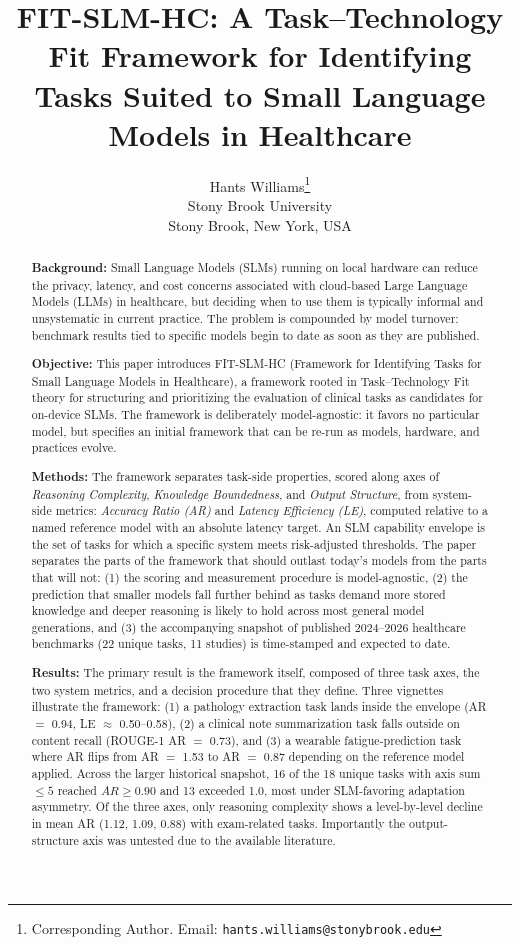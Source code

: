 \documentclass[11pt]{article}
\title{FIT-SLM-HC: A Task--Technology Fit Framework for Identifying Tasks Suited to Small Language Models in Healthcare}
\author{
  Hants Williams\thanks{Corresponding Author. Email: \texttt{hants.williams@stonybrook.edu}} \\
  Stony Brook University \\
  Stony Brook, New York, USA
}
\date{}
\begin{document}
\maketitle

\begin{abstract}
\textbf{Background:}
Small Language Models (SLMs) running on local hardware can reduce the privacy, latency, and cost concerns associated with cloud-based Large Language Models (LLMs) in healthcare, but deciding when to use them is typically informal and unsystematic in current practice. The problem is compounded by model turnover: benchmark results tied to specific models begin to date as soon as they are published.

\textbf{Objective:}
This paper introduces FIT-SLM-HC (Framework for Identifying Tasks for Small Language Models in Healthcare), a framework rooted in Task--Technology Fit theory for structuring and prioritizing the evaluation of clinical tasks as candidates for on-device SLMs. The framework is deliberately model-agnostic: it favors no particular model, but specifies an initial framework that can be re-run as models, hardware, and practices evolve.

\textbf{Methods:}
The framework separates task-side properties, scored along axes of \emph{Reasoning Complexity}, \emph{Knowledge Boundedness}, and \emph{Output Structure}, from system-side metrics: \emph{Accuracy Ratio (AR)} and \emph{Latency Efficiency (LE)}, computed relative to a named reference model with an absolute latency target. An SLM capability envelope is the set of tasks for which a specific system meets risk-adjusted thresholds. The paper separates the parts of the framework that should outlast today's models from the parts that will not: (1) the scoring and measurement procedure is model-agnostic, (2) the prediction that smaller models fall further behind as tasks demand more stored knowledge and deeper reasoning is likely to hold across most general model generations, and (3) the accompanying snapshot of published 2024--2026 healthcare benchmarks (22 unique tasks, 11 studies) is time-stamped and expected to date.

\textbf{Results:}
The primary result is the framework itself, composed of three task axes, the two system metrics, and a decision procedure that they define. Three vignettes illustrate the framework: (1) a pathology extraction task lands inside the envelope (AR $=$ 0.94, LE $\approx$ 0.50--0.58), (2) a clinical note summarization task falls outside on content recall (ROUGE-1 AR $=$ 0.73), and (3) a wearable fatigue-prediction task where AR flips from AR $=$ 1.53 to AR $=$ 0.87 depending on the reference model applied. Across the larger historical snapshot, 16 of the 18 unique tasks with axis sum $\leq 5$ reached $AR \geq 0.90$ and 13 exceeded 1.0, most under SLM-favoring adaptation asymmetry. Of the three axes, only reasoning complexity shows a level-by-level decline in mean AR (1.12, 1.09, 0.88) with exam-related tasks. Importantly the output-structure axis was untested due to the available literature.


\end{abstract}
\end{document}
